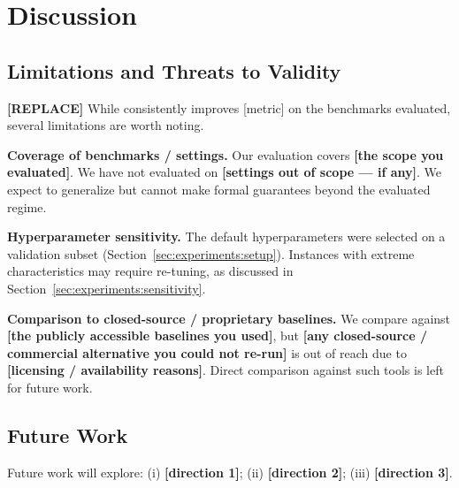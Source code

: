 \section{Discussion}
\label{sec:discussion}

\subsection{Limitations and Threats to Validity}
\label{sec:discussion:limitations}


\textbf{[REPLACE]} While \method{} consistently improves [metric] on the
benchmarks evaluated, several limitations are worth noting.

\textbf{Coverage of benchmarks / settings.} Our evaluation covers
\textbf{[the scope you evaluated]}. We have not evaluated on
\textbf{[settings out of scope --- if any]}. We expect \method{} to
generalize but cannot make formal guarantees beyond the evaluated
regime.

\textbf{Hyperparameter sensitivity.} The default hyperparameters were
selected on a validation subset (Section~\ref{sec:experiments:setup}).
Instances with extreme characteristics may require re-tuning, as
discussed in Section~\ref{sec:experiments:sensitivity}.

\textbf{Comparison to closed-source / proprietary baselines.} We compare
against \textbf{[the publicly accessible baselines you used]}, but
\textbf{[any closed-source / commercial alternative you could not
re-run]} is out of reach due to \textbf{[licensing / availability
reasons]}. Direct comparison against such tools is left for future work.

\subsection{Future Work}
\label{sec:discussion:future}

Future work will explore:
(i) \textbf{[direction 1]};
(ii) \textbf{[direction 2]};
(iii) \textbf{[direction 3]}.
